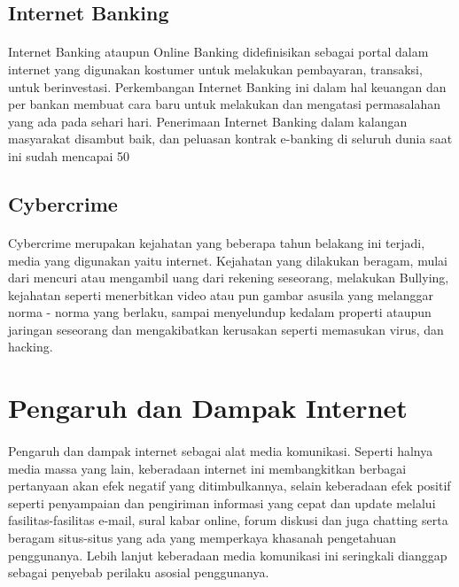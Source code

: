 \documentclass[12pt, a4paper]{article}
\begin{document}
\subsection{Internet Banking}
\paragraph{} Internet Banking ataupun Online Banking didefinisikan sebagai portal dalam internet yang digunakan kostumer untuk melakukan pembayaran, transaksi, untuk berinvestasi. Perkembangan Internet Banking ini dalam hal keuangan dan per bankan membuat cara baru untuk melakukan dan mengatasi permasalahan yang ada pada sehari hari. Penerimaan Internet Banking dalam kalangan masyarakat disambut baik, dan peluasan kontrak e-banking di seluruh dunia saat ini sudah mencapai 50%
\subsection{Cybercrime}
\paragraph{} Cybercrime merupakan kejahatan yang beberapa tahun belakang ini terjadi, media yang digunakan yaitu internet. Kejahatan yang dilakukan beragam, mulai dari mencuri atau mengambil uang dari rekening seseorang, melakukan Bullying, kejahatan seperti menerbitkan video atau pun gambar asusila yang melanggar norma -  norma yang berlaku, sampai menyelundup kedalam properti ataupun jaringan seseorang dan mengakibatkan kerusakan seperti memasukan virus, dan hacking.

\section{Pengaruh dan Dampak Internet}
\paragraph{} Pengaruh dan dampak internet sebagai alat media komunikasi. Seperti halnya media massa yang lain, keberadaan internet ini membangkitkan berbagai pertanyaan akan efek negatif yang ditimbulkannya, selain keberadaan efek positif seperti penyampaian dan pengiriman informasi yang cepat dan update melalui fasilitas-fasilitas e-mail, sural kabar online, forum diskusi dan juga chatting serta beragam situs-situs yang ada yang memperkaya khasanah pengetahuan penggunanya. Lebih lanjut keberadaan media komunikasi ini seringkali dianggap sebagai penyebab perilaku asosial penggunanya.
\end{document}
